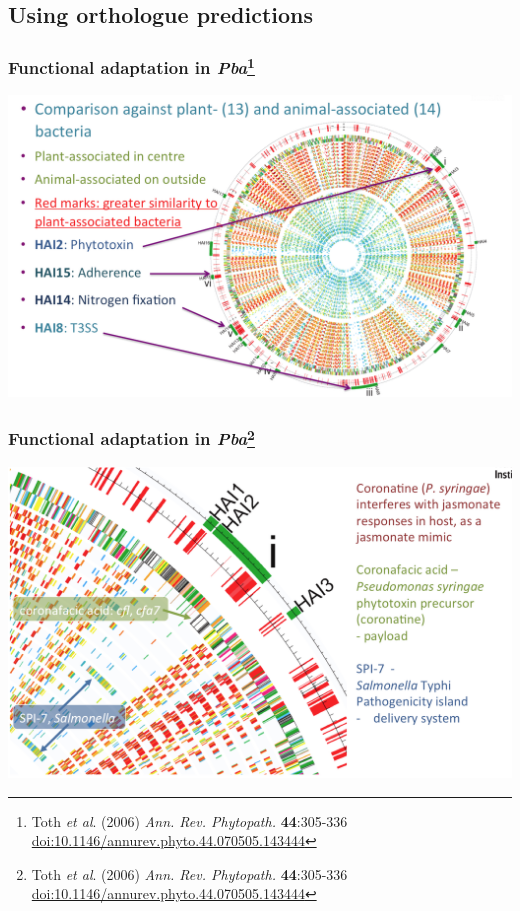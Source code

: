 
\subsection{Using orthologue predictions}

% 
\begin{frame}
  \frametitle{Functional adaptation in \textit{Pba}\footnote{\tiny{Toth \textit{et al}. (2006) \textit{Ann. Rev. Phytopath.} \textbf{44}:305-336 \href{http://dx.doi.org/10.1146/annurev.phyto.44.070505.143444}{doi:10.1146/annurev.phyto.44.070505.143444}}}}
  \begin{center}
      \includegraphics[width=1\textwidth]{images/pba_lgt} 
  \end{center}
\end{frame}

% 
\begin{frame}
  \frametitle{Functional adaptation in \textit{Pba}\footnote{\tiny{Toth \textit{et al}. (2006) \textit{Ann. Rev. Phytopath.} \textbf{44}:305-336 \href{http://dx.doi.org/10.1146/annurev.phyto.44.070505.143444}{doi:10.1146/annurev.phyto.44.070505.143444}}}}
  \begin{center}
      \includegraphics[width=1\textwidth]{images/pba_coronatine} 
  \end{center}
\end{frame}
